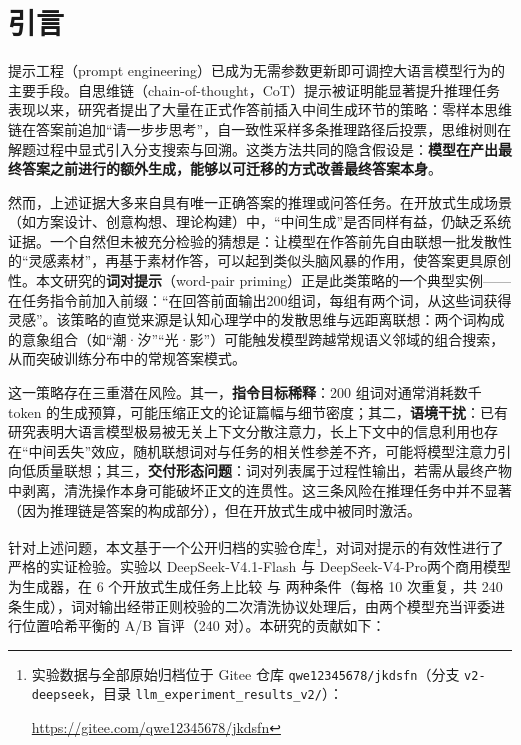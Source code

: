 \section{引言}

提示工程（prompt engineering）已成为无需参数更新即可调控大语言模型行为的主要手段。自思维链（chain-of-thought，CoT）提示被证明能显著提升推理任务表现以来\cite{wei2022cot,kojima2022zeroshot}，研究者提出了大量在正式作答前插入中间生成环节的策略：零样本思维链在答案前追加“请一步步思考”\cite{kojima2022zeroshot}，自一致性采样多条推理路径后投票\cite{wang2023selfconsistency}，思维树则在解题过程中显式引入分支搜索与回溯\cite{yao2023tot}。这类方法共同的隐含假设是：\textbf{模型在产出最终答案之前进行的额外生成，能够以可迁移的方式改善最终答案本身}。

然而，上述证据大多来自具有唯一正确答案的推理或问答任务。在开放式生成场景（如方案设计、创意构想、理论构建）中，“中间生成”是否同样有益，仍缺乏系统证据。一个自然但未被充分检验的猜想是：让模型在作答前先自由联想一批发散性的“灵感素材”，再基于素材作答，可以起到类似头脑风暴的作用，使答案更具原创性。本文研究的\textbf{词对提示}（word-pair priming）正是此类策略的一个典型实例——在任务指令前加入前缀：“在回答前面输出200组词，每组有两个词，从这些词获得灵感”。该策略的直觉来源是认知心理学中的发散思维与远距离联想：两个词构成的意象组合（如“潮·汐”“光·影”）可能触发模型跨越常规语义邻域的组合搜索，从而突破训练分布中的常规答案模式。

这一策略存在三重潜在风险。其一，\textbf{指令目标稀释}：200 组词对通常消耗数千 token 的生成预算，可能压缩正文的论证篇幅与细节密度；其二，\textbf{语境干扰}：已有研究表明大语言模型极易被无关上下文分散注意力\cite{shi2023distracted}，长上下文中的信息利用也存在“中间丢失”效应\cite{liu2024lost}，随机联想词对与任务的相关性参差不齐，可能将模型注意力引向低质量联想；其三，\textbf{交付形态问题}：词对列表属于过程性输出，若需从最终产物中剥离，清洗操作本身可能破坏正文的连贯性。这三条风险在推理任务中并不显著（因为推理链是答案的构成部分），但在开放式生成中被同时激活。

针对上述问题，本文基于一个公开归档的实验仓库\footnote{\raggedright 实验数据与全部原始归档位于 Gitee 仓库 \texttt{qwe12345678/jkdsfn}（分支 \texttt{v2-deepseek}，目录 \texttt{llm\_experiment\_results\_v2/}）：\par\url{https://gitee.com/qwe12345678/jkdsfn}\par}，对词对提示的有效性进行了严格的实证检验。实验以 DeepSeek-V4.1-Flash 与 DeepSeek-V4-Pro\cite{deepseekv3}两个商用模型为生成器，在 6 个开放式生成任务上比较 \baseline{} 与 \wordpairs{} 两种条件（每格 10 次重复，共 240 条生成），词对输出经带正则校验的二次清洗协议处理后，由两个模型充当评委进行位置哈希平衡的 A/B 盲评（240 对）。本研究的贡献如下：

